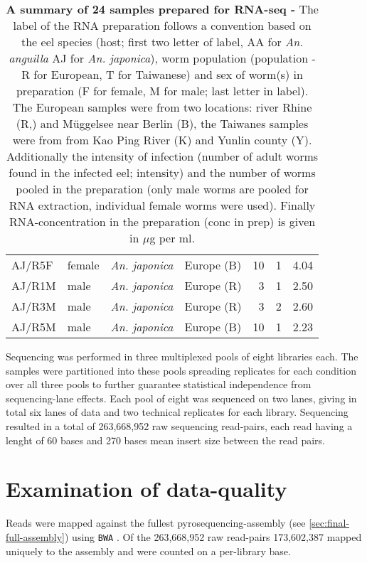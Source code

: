 \begin{table}[h]
\begin{center}
\begin{tabular}{llllrrr}
  AJ/R5F & female & \textit{An. japonica} & Europe (B) & 10 & 1 & 4.04 \\ 
  AJ/R1M & male & \textit{An. japonica} & Europe (R) & 3 & 1 & 2.50 \\ 
  AJ/R3M & male & \textit{An. japonica} & Europe (R) & 3 & 2 & 2.60 \\ 
  AJ/R5M & male & \textit{An. japonica} & Europe (B) & 10 & 1 & 2.23 \\ 
  \hline
\end{tabular}
\caption[Summary of RNA preparation]{\textbf{A summary of 24 samples
    prepared for RNA-seq -} The label of the RNA preparation follows a
  convention based on the eel species (host; first two letter of
  label, AA for \textit{An. anguilla} AJ for \textit{An. japonica}),
  worm population (population - R for European, T for Taiwanese) and
  sex of worm(s) in preparation (F for female, M for male; last letter
  in label). The European samples were from two locations: river Rhine
  (R,) and M\"uggelsee near Berlin (B), the Taiwanes samples were from
  from Kao Ping River (K) and Yunlin county (Y). Additionally the
  intensity of infection (number of adult worms found in the infected
  eel; intensity) and the number of worms pooled in the preparation
  (only male worms are pooled for RNA extraction, individual female
  worms were used). Finally RNA-concentration in the preparation (conc
  in prep) is given in $\mu$g per ml.}
\label{tab:lib-prep}
\end{center}
\end{table}


Sequencing was performed in three multiplexed pools of eight libraries
each. The samples were partitioned into these pools spreading
replicates for each condition over all three pools to further
guarantee statistical independence from sequencing-lane effects. Each
pool of eight was sequenced on two lanes, giving in total six lanes of
data and two technical replicates for each library. Sequencing
resulted in a total of 263,668,952 raw sequencing read-pairs, each
read having a lenght of 60 bases and 270 bases mean insert size
between the read pairs.

\section{Examination of data-quality}

Reads were mapped against the fullest pyrosequencing-assembly (see
\ref{sec:final-full-assembly}) using \texttt{BWA}
\cite{pmid20080505}. Of the 263,668,952 raw read-pairs 173,602,387
mapped uniquely to the assembly and were counted on a per-library
base. 

